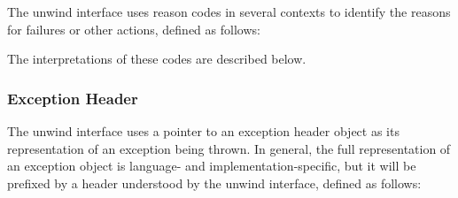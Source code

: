 The unwind interface uses reason codes in several contexts to identify the 
reasons for failures or other actions, defined as follows:


The interpretations of these codes are described below. 

\subsubsection{Exception Header}

The unwind interface uses a pointer to an exception header object
as its representation of an exception being thrown. In general,
the full representation of an exception object is language- and
implementation-specific, but it will be prefixed by a header understood
by the unwind interface, defined as follows:



